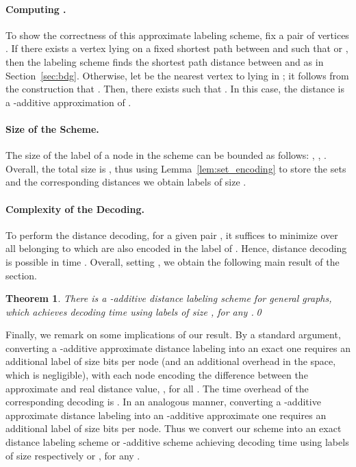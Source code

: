 \documentclass{article}[11pt,letter]
\newtheorem{theorem}[definition]{Theorem}
\begin{document}
\paragraph{Computing .}
To show the correctness of this approximate labeling scheme, fix a pair of vertices . If there exists a vertex  lying on a fixed shortest path  between  and  such that  or , then the labeling scheme finds the shortest path distance between  and  as in Section~\ref{sec:bdg}. Otherwise, let  be the nearest vertex to  lying in ; it follows from the construction that . Then, there exists  such that . In this case, the distance  is a -additive approximation of .

\paragraph{Size of the Scheme.}
The size of the label of a node  in the scheme can be bounded as follows: , , . Overall, the total size is , thus using Lemma~\ref{lem:set_encoding} to store the sets and the corresponding distances we obtain labels of
size .

\paragraph{Complexity of the Decoding.}
To perform the distance decoding, for a given pair , it suffices to minimize  over all  belonging to  which are also encoded in the label of . Hence, distance decoding is possible in time . Overall, setting , we obtain the following main result of the section.

\begin{theorem}
There is a -additive distance labeling scheme for general graphs, which achieves decoding time  using labels of size , for any .\qed
\end{theorem}

Finally, we remark on some implications of our result. By a standard argument, converting a -additive approximate distance labeling into an exact one requires an additional label of size  bits per node (and an additional  overhead in the space, which is negligible), with each node  encoding the difference between the approximate and real distance value, , for all . The time overhead of the corresponding decoding is . In an analogous manner, converting a -additive approximate distance labeling into an -additive approximate one requires an additional label of size  bits per node. Thus we convert our scheme into an exact distance labeling scheme or -additive scheme achieving  decoding time using labels of size respectively  or , for any .
\end{document}
